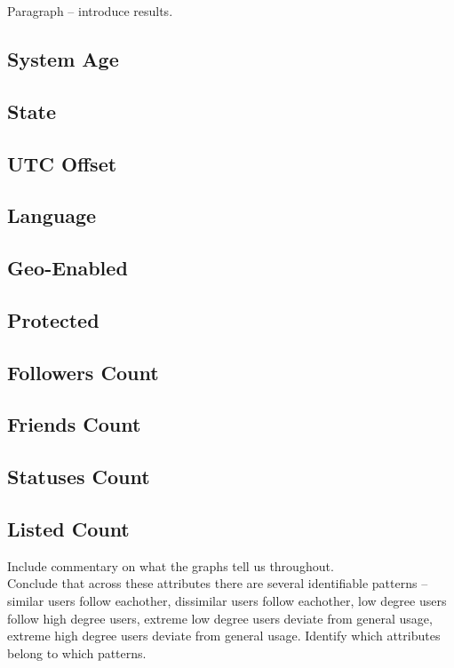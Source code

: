 Paragraph -- introduce results. \\

\subsection{System Age}
\subsection{State}
\subsection{UTC Offset}
\subsection{Language}
\subsection{Geo-Enabled}
\subsection{Protected}
\subsection{Followers Count}
\subsection{Friends Count}
\subsection{Statuses Count}
\subsection{Listed Count}

Include commentary on what the graphs tell us throughout.\\

Conclude that across these attributes there are several identifiable patterns -- similar users follow eachother, dissimilar users follow eachother, low degree users follow high degree users, extreme low degree users deviate from general usage, extreme high degree users deviate from general usage.  Identify which attributes belong to which patterns.\\